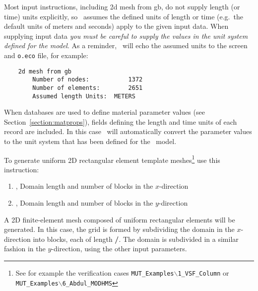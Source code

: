 Most input instructions, including \textsf{2d mesh from gb}, do not supply length (or time) units explicitly, so \mut\ assumes the defined units of length or time (e.g.\ the default units of meters and seconds) apply to the given input data. When supplying input data {\em you must be careful to supply the values in the unit system defined for the model}.  As a reminder, \mut\ will echo the assumed units to the screen and \texttt{o.eco} file, for example:
\begin{verbatim}
    2d mesh from gb
    	Number of nodes:           1372
    	Number of elements:        2651
    	Assumed length Units:  METERS
\end{verbatim}

When databases are used to define material parameter values (see Section~\ref{section:matprops}), fields defining the length and time units of each record are included. In this case \mut\ will automatically convert the parameter values to the unit system that has been defined for the \mfus\ model.

\pagebreak
To generate uniform 2D rectangular element template meshes\footnote{See for example the verification cases \texttt{MUT\_Examples$\backslash$1\_VSF\_Column} or \texttt{MUT\_Examples$\backslash$6\_Abdul\_MODHMS}} use this instruction:

    {
    \squish
    \begin{enumerate}
    \item {},   Domain length and number of blocks in the $x$-direction
    \item {},   Domain length and number of blocks in the $y$-direction
    \end{enumerate}
    A 2D finite-element mesh composed of uniform rectangular elements will be generated. In this case, the
    grid is formed by subdividing the domain in the $x$-direction into  blocks, each of length
    \textbf{/}. The domain is subdivided in a similar fashion in the $y$-direction, using the other input parameters.
    }



%
%


